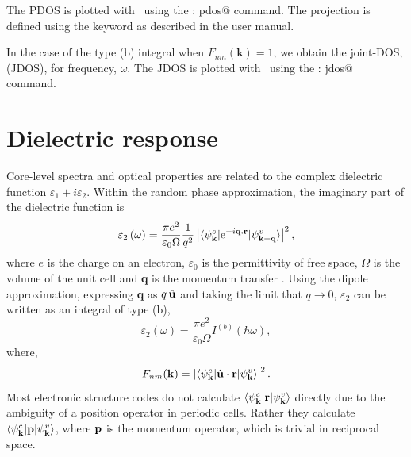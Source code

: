 \documentclass[a4paper,11pt,twoside]{book}
\newcommand{\kbf}{\mathbf{k}}
\newcommand{\e}{\mathrm{e}}
\begin{document}
The PDOS is plotted with \optados\ using the \verb@task : pdos@
command. 
%
The projection is defined using the \verb@pdos@ keyword as described
in the user manual.

In the case of the type (b) integral when $F_{nm}(\kbf)=1$, we
obtain the joint-DOS, (JDOS), for frequency, $\omega$.
%
The JDOS is plotted with \optados\ using the \verb@task : jdos@ command.



\section{Dielectric response}

Core-level spectra and optical properties are related to the complex dielectric function $\varepsilon_1+i\varepsilon_2$.  Within the random phase approximation, the imaginary part of the dielectric function is
\begin{equation}
\varepsilon_2 \left ( \omega \right ) = \frac{\pi e^2}{\varepsilon_0 \Omega} \frac{1}{q^2} \left | \langle  \psi^c_{\bf k}   |  \e^{-i{\bf q}.{\bf r}} | \psi^v_{\bf k + q} \rangle\right |^2,
\end{equation}
where $e$ is the charge on an electron, $\varepsilon_0$ is the permittivity of free space, $\Omega$ is the volume of the unit cell and {\bf q} is the momentum transfer \cite{dressel}.
Using the dipole approximation, expressing {\bf q} as $q\,\hat{\bf{u}}$ and taking the limit that $q \rightarrow 0$, $\varepsilon_2$ can be written as an integral of type (b), 
\begin{equation}
\varepsilon_2 \left ( \omega \right ) = \frac{\pi e^2}{\varepsilon_0 \Omega} I^{(b)}\left ( \hbar \omega \right ), 
\label{Eqn:Epsilon2}
\end{equation}
where,
\begin{equation}
F_{nm}(\kbf)= \left | \langle \psi^c_{\bf k}  |  \hat{\bf u}\cdot {\bf r} | \psi^v_{\bf k} \rangle\right |^2.
\label{Eqn:Dipole}
\end{equation}
Most electronic structure codes do not calculate $\langle \psi^c_{\bf k}  |  {\bf r} | \psi^v_{\bf k} \rangle$ directly due to the ambiguity of a position operator in periodic cells. 
%
Rather they calculate $\langle \psi^c_{\bf k}  |  {\bf p} | \psi^v_{\bf k} \rangle$, where ${\bf p}$ is the momentum operator, which is trivial in reciprocal space. 
\end{document}
